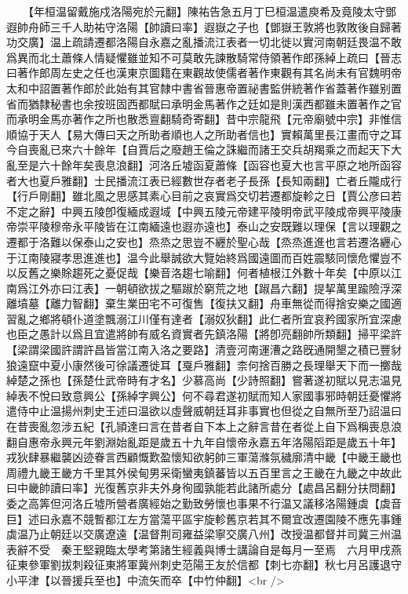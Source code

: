 　　【年桓温留戴施戍洛陽宛於元翻】陳祐告急五月丁巳桓温遣庾希及竟陵太守鄧遐帥舟師三千人助祐守洛陽【帥讀曰率】遐嶽之子也【鄧嶽王敦將也敦敗後自歸著功交廣】温上疏請遷都洛陽自永嘉之亂播流江表者一切北徙以實河南朝廷畏温不敢爲異而北土蕭條人情疑懼雖並知不可莫敢先諫散騎常侍領著作郎孫綽上疏曰【晉志曰著作郎周左史之任也漢東京圖籍在東觀故使儒者著作東觀有其名尚未有官魏明帝太和中詔置著作郎於此始有其官隸中書省晉惠帝置祕書監併統著作省蓋著作雖别置省而猶隸秘書也余按班固西都賦曰承明金馬著作之廷如是則漢西都雖未置著作之官而承明金馬亦著作之所也散悉亶翻騎奇寄翻】昔中宗龍飛【元帝廟號中宗】非惟信順協于天人【易大傳曰天之所助者順也人之所助者信也】實賴萬里長江畫而守之耳今自喪亂已來六十餘年【自賈后之廢趙王倫之誅繼而諸王交兵胡羯乘之而起天下大亂至是六十餘年矣喪息浪翻】河洛丘墟函夏蕭條【函容也夏大也言平原之地所函容者大也夏戶雅翻】士民播流江表已經數世存者老子長孫【長知兩翻】亡者丘隴成行【行戶剛翻】雖北風之思感其素心目前之哀實爲交切若遷都旋軫之日【賈公彦曰若不定之辭】中興五陵卽復緬成遐域【中興五陵元帝建平陵明帝武平陵成帝興平陵康帝崇平陵穆帝永平陵皆在江南緬遠也遐亦遠也】泰山之安既難以理保【言以理觀之遷都于洛難以保泰山之安也】烝烝之思豈不纒於聖心哉【烝烝進進也言若遷洛纒心于江南陵寢孝思進進也】温今此舉誠欲大覽始終爲國遠圖而百姓震駭同懷危懼豈不以反舊之樂賖趨死之憂促哉【樂音洛趨七喻翻】何者植根江外數十年矣【中原以江南爲江外亦曰江表】一朝頓欲拔之驅踧於窮荒之地【踧昌六翻】提挈萬里踰險浮深離墳墓【離力智翻】棄生業田宅不可復售【復扶又翻】舟車無從而得捨安樂之國適習亂之鄉將頓仆道塗飄溺江川僅有達者【溺奴狄翻】此仁者所宜哀矜國家所宜深慮也臣之愚計以爲且宜遣將帥有威名資實者先鎮洛陽【將卽亮翻帥所類翻】掃平梁許【梁謂梁國許謂許昌皆當江南入洛之要路】清壹河南運漕之路旣通開墾之積已豐豺狼遠竄中夏小康然後可徐議遷徙耳【戛戶雅翻】柰何捨百勝之長理舉天下而一擲哉綽楚之孫也【孫楚仕武帝時有才名】少慕高尚【少詩照翻】嘗著遂初賦以見志温見綽表不悅曰致意興公【孫綽字興公】何不尋君遂初賦而知人家國事邪時朝廷憂懼將遣侍中止温揚州刺史王述曰温欲以虛聲威朝廷耳非事實也但從之自無所至乃詔温曰在昔喪亂忽涉五紀【孔頴達曰言在昔者自下本上之辭言昔在者從上自下爲稱喪息浪翻自惠帝永興元年劉淵始亂距是歲五十九年自懷帝永嘉五年洛陽䧟距是歲五十年】戎狄肆暴繼襲凶迹眷言西顧慨歎盈懷知欲躬帥三軍蕩滌氛穢廓清中畿【中畿王畿也周禮九畿王畿方千里其外侯甸男采衛蠻夷鎮蕃皆以五百里言之王畿在九畿之中故此曰中畿帥讀曰率】光復舊京非夫外身徇國孰能若此諸所處分【處昌呂翻分扶問翻】委之高筭但河洛丘墟所營者廣經始之勤致勞懷也事果不行温又議移洛陽鍾虡【虡音巨】述曰永嘉不競暫都江左方當蕩平區宇旋軫舊京若其不爾宜改遷園陵不應先事鍾虡温乃止朝廷以交廣遼遠【温督荆司雍益梁寧交廣八州】改授温都督并司冀三州温表辭不受　秦王堅親臨太學考第諸生經義與博士講論自是每月一至焉　六月甲戌燕征東參軍劉拔刺殺征東將軍冀州刺史范陽王友於信都【刺七亦翻】秋七月呂護退守小平津【以晉援兵至也】中流矢而卒【中竹仲翻】<br />
